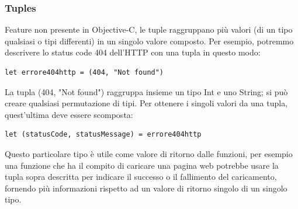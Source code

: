 \subsubsection{Tuples}
Feature non presente in Objective-C, le tuple raggruppano più valori (di un tipo qualsiasi o tipi differenti) in un singolo valore composto. Per esempio, potremmo descrivere lo status code 404 dell'HTTP con una tupla in questo modo:
\lstset{language=[Objective]C, breakindent=40pt, breaklines}
\begin{lstlisting}
let errore404http = (404, "Not found")
\end{lstlisting}
La tupla (404, "Not found") raggruppa insieme un tipo Int e uno String; si può creare qualsiasi permutazione di tipi. Per ottenere i singoli valori da una tupla, quest'ultima deve essere scomposta:
\lstset{language=[Objective]C, breakindent=40pt, breaklines}
\begin{lstlisting}
let (statusCode, statusMessage) = errore404http
\end{lstlisting}
Questo particolare tipo è utile come valore di ritorno dalle funzioni, per esempio una funzione che ha il compito di caricare una pagina web potrebbe usare la tupla sopra descritta per indicare il successo o il fallimento del caricamento, fornendo più informazioni rispetto ad un valore di ritorno singolo di un singolo tipo. 
